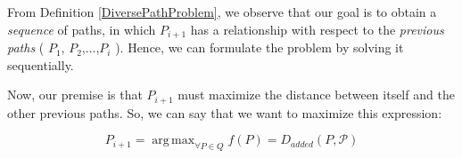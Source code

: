 \documentclass[graybox]{svmult}
\newcommand{\PathSet}{\ensuremath{\mathcal P} }
\newcommand{\Path}{\ensuremath{P} }
\newcommand{\AddedDistance}{\ensuremath{D_{added}} }
\DeclareMathOperator*{\argmax}{arg\,max}
\begin{document}
From Definition \ref{DiversePathProblem}, we observe that our goal is to obtain a \emph{sequence} of paths, in which $\Path_{i+1}$ has a relationship with respect to the \emph{previous paths} ( $\Path_{1}$, $\Path_{2}$,...,$\Path_{i}$ ). Hence, we can formulate the problem by solving it sequentially.
\medskip

Now, our premise is that $\Path_{i+1}$ must maximize the distance between itself and the other previous paths. So, we can say that we want to maximize this expression:

\[ \Path_{i+1} = \argmax _{\forall \Path \in Q} f(\Path) = \AddedDistance (\Path, \PathSet) \]

\begin{algorithm}

\end{algorithm}



\end{document}
